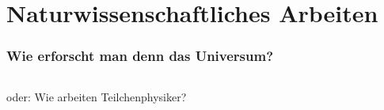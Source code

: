 \documentclass{beamer}
\begin{document}
\section{Naturwissenschaftliches Arbeiten}
\begin{frame}
  \frametitle{Wie erforscht man denn das Universum?}
  \vskip-0.5cm
  \begin{columns}[T]
    \begin{column}{0.55\textwidth}
      \begin{flushleft}
        oder: Wie arbeiten Teilchenphysiker?
      \end{flushleft}
      \begin{center}
\end{center}
\end{column}
\end{columns}
\end{frame}
\end{document}
